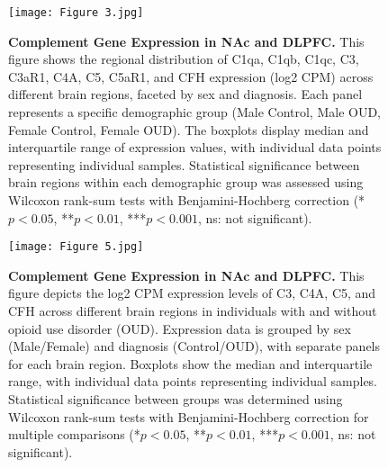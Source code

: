 \documentclass[10pt,letterpaper]{article}
\begin{document}
\begin{figure}[ht]%
\texttt{[image: Figure 3.jpg]}
\caption{\color{Gray} \textbf{Complement Gene Expression in NAc and DLPFC. } 
This figure shows the regional distribution of C1qa, C1qb, C1qc, C3, C3aR1, C4A, C5, C5aR1, and CFH expression (log2 CPM) across different brain regions, faceted by sex and diagnosis. Each panel represents a specific demographic group (Male Control, Male OUD, Female Control, Female OUD). The boxplots display median and interquartile range of expression values, with individual data points representing individual samples. Statistical significance between brain regions within each demographic group was assessed using Wilcoxon rank-sum tests with Benjamini-Hochberg correction (*$p<0.05$, **$p<0.01$, ***$p<0.001$, ns: not significant).
}
\label{Box Plots} %
\end{figure}

\begin{figure}[ht]%
\texttt{[image: Figure 5.jpg]}
\caption{\color{Gray} \textbf{Complement Gene Expression in NAc and DLPFC. } 
This figure depicts the log2 CPM expression levels of C3, C4A, C5, and CFH across different brain regions in individuals with and without opioid use disorder (OUD). Expression data is grouped by sex (Male/Female) and diagnosis (Control/OUD), with separate panels for each brain region. Boxplots show the median and interquartile range, with individual data points representing individual samples. Statistical significance between groups was determined using Wilcoxon rank-sum tests with Benjamini-Hochberg correction for multiple comparisons (*$p<0.05$, **$p<0.01$, ***$p<0.001$, ns: not significant).
}
\label{Box Plots2} %
\end{figure}
\end{document}
